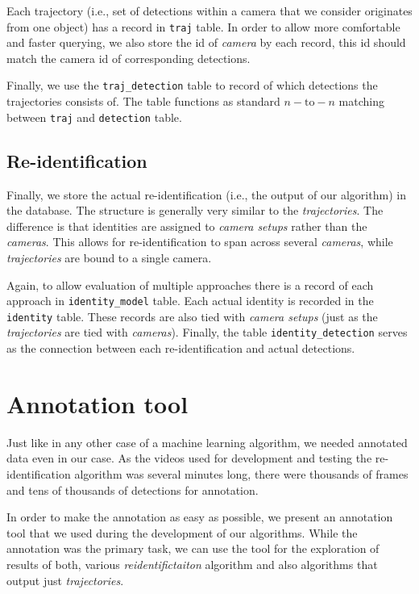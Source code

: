 Each trajectory (i.e., set of detections within a camera that we consider originates
from one object) has a record in \texttt{traj} table. In order to allow more comfortable and
faster querying, we also store the id of \emph{camera} by each record, this id should
match the camera id of corresponding detections.

Finally, we use the \texttt{traj\_detection} table to record of which detections
the trajectories consists of. The table functions as standard $n-\textrm{to}-n$
matching between \texttt{traj} and \texttt{detection} table.

\section{Re-identification}

Finally, we store the actual re-identification (i.e., the output of our algorithm)
in the database. The structure is generally very similar to the \emph{trajectories}. The difference is
that identities are assigned to \emph{camera setups} rather than
the \emph{cameras}. This allows for re-identification to span across several \emph{cameras}, while \emph{trajectories} are bound to a single camera.

Again, to allow evaluation of multiple approaches there is a record of each approach
in \texttt{identity\_model} table. Each actual identity is recorded in the
\texttt{identity} table. These records are also tied with \emph{camera setups}
(just as the \emph{trajectories} are tied with \emph{cameras}). Finally, the table
\texttt{identity\_detection} serves as the connection between each re-identification
and actual detections.

\chapter{Annotation tool}

Just like in any other case of a machine learning algorithm, we needed annotated data even in our case. As the videos used for development and testing the re-identification algorithm was several minutes long, there were thousands of frames and tens of thousands
of detections for annotation.

In order to make the annotation as easy as possible, we present an annotation tool that we used during the development of our algorithms. While the annotation was the primary task, we can use the tool for the exploration of results of both, various 
\emph{reidentifictaiton} algorithm and also algorithms that output just 
\emph{trajectories}.

